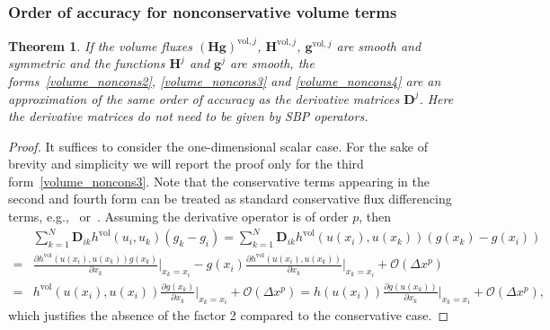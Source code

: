\documentclass[]{scrartcl}
\newcommand{\mtx}[1]{\boldsymbol{#1}}
\renewcommand{\vec}[1]{\boldsymbol{#1}}
\newtheorem{theorem}{Theorem}[section]
\theoremstyle{definition}
\begin{document}
\subsubsection{Order of accuracy for nonconservative volume terms}
\begin{theorem}
    If the volume fluxes $(\vec{H}\vec{g})^{\mathrm{vol},j}$, $\vec{H}^{\mathrm{vol},j}$, $\vec{g}^{\mathrm{vol},j}$ are smooth and symmetric and the functions $\vec{H}^j$ and $\vec{g}^j$ are smooth, the forms~\eqref{volume_noncons2}, \eqref{volume_noncons3} and \eqref{volume_noncons4} are an approximation of the same order of accuracy as the derivative matrices $\mtx{D}^j$. Here the derivative matrices do not need to be given by SBP operators.
\end{theorem}
\begin{proof}
    It suffices to consider the one-dimensional scalar case. For the sake of brevity and simplicity we will report the proof only for the third form~\eqref{volume_noncons3}.
    Note that the conservative terms appearing in the second and fourth form can be treated as standard conservative flux differencing terms, e.g.,~\cite{chen2017entropy} or~\cite[Lemma 3.17]{ranocha2018thesis}.
    Assuming the derivative operator is of order $p$, then
    \begin{equation}
        \begin{aligned}
        & \sum_{k = 1}^N \mtx{D}_{ik} h^{\mathrm{vol}}\left ( u_i, u_k \right ) \left (g_k - g_i \right ) = \sum_{k=1}^N \mtx{D}_{ik} h^{\mathrm{vol}}\left (u(x_i), u(x_k) \right ) \left (g(x_k) - g(x_i) \right )\\
        =& \frac{\partial h^{\mathrm{vol}}\left (u(x_i), u(x_k) \right ) g\left ( x_k \right )}{\partial x_k} \Bigg |_{x_k = x_i} - g(x_i) \frac{\partial h^{\mathrm{vol}}\left ( u(x_i), u(x_k)\right )}{\partial x_k}\Bigg |_{x_k = x_i} + \mathcal{O}\left (\Delta x^p \right )\\
        =& h^{\mathrm{vol}}\left (u(x_i), u(x_i) \right ) \frac{\partial g\left ( x_k \right )}{\partial x_k} \Bigg |_{x_k = x_i} + \mathcal{O}\left (\Delta x^p \right ) = h\left ( u  (x_i) \right ) \frac{\partial g\left ( u(x_k) \right )}{\partial x_k} \Bigg |_{x_k = x_i} + \mathcal{O}\left (\Delta x^p \right ),
        \end{aligned}
    \end{equation}
    which justifies the absence of the factor 2 compared to the conservative case.
\end{proof}
\end{document}
